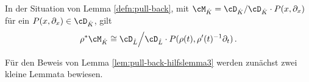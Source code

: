 \begin{lem} \label{lem:pull-back-hilfslemma3}
In der Situation von Lemma \ref{defn:pull-back}, mit
$\cM_{\hat K}=\cD_{\hat K}/\cD_{\hat K}\cdot P(x,\partial_x)$ für ein
$P(x,\partial_x)\in\cD_{\hat K}$, gilt
\[\rho^*\cM_{\hat K}\cong \cD_{\hat L}\Big/\cD_{\hat L}\cdot
  P(\rho(t),\rho'(t)^{-1}\partial_t) \,. \]
\begin{comment}
also wird der Übergang beschrieben durch
\begin{align*}
x          &\rightarrow \rho(t) \\
\partial_x &\rightarrow \rho'(t)^{-1}\partial_t
\end{align*}
\end{comment}
\end{lem}
\begin{comment}
\cite[Seite 130]{coutinho1995primer} Holonomic modules are preserved under
this construction.
\end{comment}
%
\begin{comment}
\cite[Page 34]{sabbah_cimpa90}
Sei $\cM_{\hat K}$ ein formaler Meromorpher Zusammenhang. Man definiert
$\pi^*\cM_{\hat K}$ als den Vektor Raum über $\hat L:\pi^*\cM_{\hat K}=\hat
L\otimes_{\hat K}\cM_{\hat K}$. Dann definiert man die Wirkung von $\partial_t$
durch: $t\partial_t\cdot(1\otimes m)=q(1\otimes(x\partial_x\otimes m))$ und
damit
\[
t\partial_t\cdot(\phi\otimes m)=q(\phi\otimes(x\partial_x\cdot
m))+((t\frac{\partial\phi}{\partial t})\otimes m) \,.
\]
Man erhält damit die Wirkung von $\partial_t=t^{-1}(t\partial_t)$.
\end{comment}

Für den Beweis von Lemma \ref{lem:pull-back-hilfslemma3} werden zunächst zwei
kleine Lemmata bewiesen.

